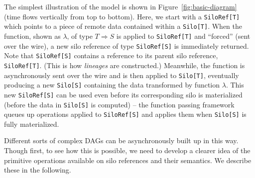 \documentclass{jfp1}
\begin{document}
The simplest illustration of the model is shown in
Figure~\ref{fig:basic-diagram} (time flows vertically from top to bottom). Here,
we start with a \verb|SiloRef[T]| which points to a piece of remote data
contained within a \verb|Silo[T]|. When the function, shown as $\lambda$, of
type $T \Rightarrow S$ is applied to \verb|SiloRef[T]| and ``forced'' (sent over
the wire), a new silo reference of type \verb|SiloRef[S]| is immediately
returned. Note that \verb|SiloRef[S]| contains a reference to its parent silo
reference, \verb|SiloRef[T]|. (This is how {\em lineages} are constructed.)
Meanwhile, the function is asynchronously sent over the wire and is then applied
to \verb|Silo[T]|, eventually producing a new \verb|Silo[S]| containing the data
transformed by function $\lambda$. This new \verb|SiloRef[S]| can be used even
before its corresponding silo is materialized (\ie before the data in
\verb|Silo[S]| is computed) – the function passing framework queues up
operations applied to \verb|SiloRef[S]| and applies them when \verb|Silo[S]| is
fully materialized.

Different sorts of complex DAGs can be asynchronously built up in this way.
Though first, to see how this is possible, we need to develop a clearer idea of
the primitive operations available on silo references and their semantics. We
describe these in the following.
\end{document}

